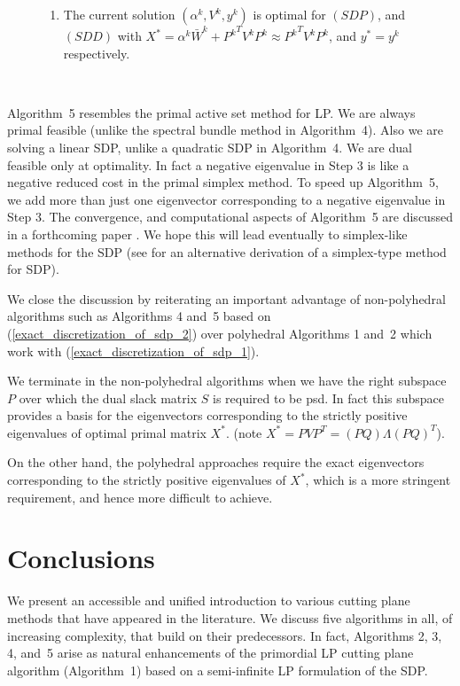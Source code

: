 \documentclass[12pt]{kluwer}
\begin{document}
\begin{article}
\begin{figure}
{\begin{minipage}{\textwidth}
\begin{enumerate}
\begin{displaymath}
\begin{array}{ccc}
\end{array}
\end{displaymath}
where $\mbox{orth}(M)$ denotes the elements of an orthogonal basis of the range of~$M$.
Return to Step 2.
\item The current solution $(\alpha^k,V^k,y^k)$ is optimal for $(SDP)$, and $(SDD)$ with
$X^* = \alpha^k \bar{W}^k + {P^k}^TV^kP^k \approx {P^k}^TV^kP^k$, and $y^* = y^k$
respectively.
\end{enumerate}
\end{minipage}
}  \\
\end{figure}
Algorithm~5 resembles the primal active set method for LP. We are always primal feasible
(unlike the spectral bundle method in Algorithm~4). Also we are solving a linear SDP,
unlike a quadratic SDP in Algorithm~4. We are dual feasible only at optimality.
In fact a negative eigenvalue in Step 3 is like a negative reduced cost in the primal simplex method.
To speed up Algorithm~5, we add more than just one eigenvector corresponding to a negative
eigenvalue in Step 3. The convergence, and computational aspects of Algorithm~5 are
discussed in a forthcoming paper \cite{krishnan_mitchell_2}. We hope
this will lead eventually to simplex-like methods for the SDP (see
 for an alternative derivation of a simplex-type
method for SDP).

We close the discussion by reiterating an important advantage of 
non-polyhedral algorithms such as Algorithms 4 and~5 based
on (\ref{exact_discretization_of_sdp_2}) over polyhedral
Algorithms 1 and~2 which work with
(\ref{exact_discretization_of_sdp_1}).

We terminate in the non-polyhedral algorithms when we have the right subspace $P$
over which the dual slack matrix $S$ is required to be psd. In fact this subspace provides a basis
for the eigenvectors corresponding to the strictly positive eigenvalues of optimal primal matrix $X^*$.
(note $X^* = PVP^T = (PQ) \Lambda (PQ)^T$).

On the other hand, the polyhedral approaches require the exact eigenvectors
corresponding to the strictly positive eigenvalues of $X^*$, which is a more stringent
requirement, and hence more difficult to achieve.

\section{Conclusions}

We present an accessible and unified introduction to various cutting plane
methods that have appeared in the literature. We discuss five algorithms in all,
of increasing complexity, that build on their predecessors. In fact,
Algorithms 2, 3, 4, and~5
arise as natural enhancements of the primordial LP cutting plane algorithm (Algorithm~1)
based on a semi-infinite LP formulation of the SDP.


\end{article}
\end{document}
